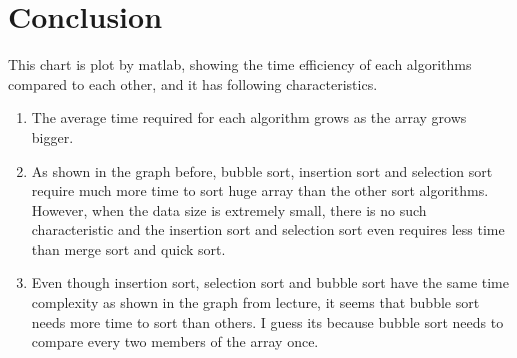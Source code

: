 \documentclass[12pt]{article}
\begin{document}
\section{Conclusion}
This chart is plot by matlab, showing the time efficiency of each algorithms compared to each other, and it has following characteristics.
\begin{enumerate}
\item The average time required for each algorithm grows as the array grows bigger.
\item As shown in the graph before, bubble sort, insertion sort and selection sort require much more time to sort huge array than the other sort algorithms. However, when the data size is extremely small, there is no such characteristic and the insertion sort and selection sort even requires less time than merge sort and quick sort.
\item Even though insertion sort, selection sort and bubble sort have the same time complexity as shown in the graph from lecture, it seems that bubble sort needs more time to sort than others. I guess its because bubble sort needs to compare every two members of the array once.
\end{enumerate}
\end{document}
